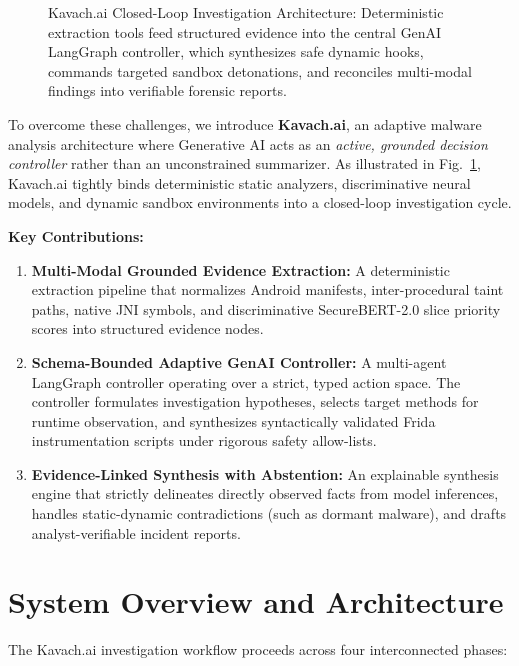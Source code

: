 \documentclass[conference]{IEEEtran}
\begin{document}
\begin{figure}[t]
\caption{Kavach.ai Closed-Loop Investigation Architecture: Deterministic extraction tools feed structured evidence into the central GenAI LangGraph controller, which synthesizes safe dynamic hooks, commands targeted sandbox detonations, and reconciles multi-modal findings into verifiable forensic reports.}
\label{fig:genai_arch}
\end{figure}

To overcome these challenges, we introduce \textbf{Kavach.ai}, an adaptive malware analysis architecture where Generative AI acts as an \textit{active, grounded decision controller} rather than an unconstrained summarizer. As illustrated in Fig.~\ref{fig:genai_arch}, Kavach.ai tightly binds deterministic static analyzers, discriminative neural models, and dynamic sandbox environments into a closed-loop investigation cycle.

\textbf{Key Contributions:}
\begin{enumerate}
    \item \textbf{Multi-Modal Grounded Evidence Extraction:} A deterministic extraction pipeline that normalizes Android manifests, inter-procedural taint paths, native JNI symbols, and discriminative SecureBERT-2.0 slice priority scores into structured evidence nodes.
    \item \textbf{Schema-Bounded Adaptive GenAI Controller:} A multi-agent LangGraph controller operating over a strict, typed action space. The controller formulates investigation hypotheses, selects target methods for runtime observation, and synthesizes syntactically validated Frida instrumentation scripts under rigorous safety allow-lists.
    \item \textbf{Evidence-Linked Synthesis with Abstention:} An explainable synthesis engine that strictly delineates directly observed facts from model inferences, handles static-dynamic contradictions (such as dormant malware), and drafts analyst-verifiable incident reports.
\end{enumerate}

\section{System Overview and Architecture}
The Kavach.ai investigation workflow proceeds across four interconnected phases:
\end{document}
